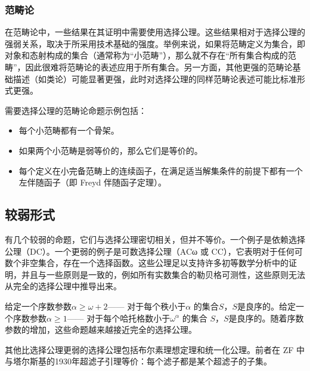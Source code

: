 \subsubsection{范畴论}  
在范畴论中，一些结果在其证明中需要使用选择公理。这些结果相对于选择公理的强弱关系，取决于所采用技术基础的强度。举例来说，如果将范畴定义为集合，即对象和态射构成的集合（通常称为“小范畴”），那么就不存在“所有集合构成的范畴”，因此很难将范畴论的表述应用于所有集合。另一方面，其他更强的范畴论基础描述（如类论）可能显著更强，此时对选择公理的同样范畴论表述可能比标准形式更强。

需要选择公理的范畴论命题示例包括：
\begin{itemize}
\item 每个小范畴都有一个骨架。  
\item 如果两个小范畴是弱等价的，那么它们是等价的。  
\item 每个定义在小完备范畴上的连续函子，在满足适当解集条件的前提下都有一个左伴随函子（即 Freyd 伴随函子定理）。
\end{itemize}
\subsection{较弱形式}  
有几个较弱的命题，它们与选择公理密切相关，但并不等价。一个例子是依赖选择公理（DC）。一个更弱的例子是可数选择公理（ACω 或 CC），它表明对于任何可数个非空集合，存在一个选择函数。这些公理足以支持许多初等数学分析中的证明，并且与一些原则是一致的，例如所有实数集合的勒贝格可测性，这些原则无法从完全的选择公理中推导出来。

给定一个序数参数\(\alpha \geq \omega + 2\)—— 对于每个秩小于\(\alpha\) 的集合\(S\)，\(S\)是良序的。给定一个序数参数\(\alpha \geq 1\)—— 对于每个哈托格数小于\(\omega^\alpha\) 的集合 \(S\)，\(S\)是良序的。随着序数参数的增加，这些命题越来越接近完全的选择公理。

其他比选择公理更弱的选择公理包括布尔素理想定理和统一化公理。前者在 ZF 中与塔尔斯基的1930年超滤子引理等价：每个滤子都是某个超滤子的子集。